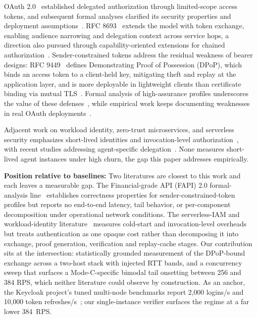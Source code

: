 \documentclass[conference]{IEEEtran}
\begin{document}
OAuth 2.0~\cite{rfc6749} established delegated authorization through limited-scope access tokens, and subsequent formal analyses clarified its security properties and deployment assumptions~\cite{oauth_formal,oidc_formal}. RFC 8693~\cite{rfc8693} extends the model with token exchange, enabling audience narrowing and delegation context across service hops, a direction also pursued through capability-oriented extensions for chained authorization~\cite{li2022capability}. Sender-constrained tokens address the residual weakness of bearer designs: RFC 9449~\cite{rfc9449} defines Demonstrating Proof of Possession (DPoP), which binds an access token to a client-held key, mitigating theft and replay at the application layer, and is more deployable in lightweight clients than certificate binding via mutual TLS~\cite{rfc8705}. Formal analysis of high-assurance profiles underscores the value of these defenses~\cite{fapi2_formal}, while empirical work keeps documenting weaknesses in real OAuth deployments~\cite{rahat2022cerberus}.

Adjacent work on workload identity, zero-trust microservices, and serverless security emphasizes short-lived identities and invocation-level authorization~\cite{eztrust2019,pontes2023spire,marin2022serverless,nist_zta}, with recent studies addressing agent-specific delegation~\cite{authenticated_delegation_agents,zouari2025leastprivilege}. None measures short-lived agent instances under high churn, the gap this paper addresses empirically.

\textbf{Position relative to baselines:} Two literatures are closest to this work and each leaves a measurable gap. The Financial-grade API (FAPI) 2.0 formal-analysis line~\cite{fapi2_formal,oauth_formal,oidc_formal} establishes correctness properties for sender-constrained-token profiles but reports no end-to-end latency, tail behavior, or per-component decomposition under operational network conditions. The serverless-IAM and workload-identity literature~\cite{sankaran2020,marin2022serverless,eztrust2019,pontes2023spire} measures cold-start and invocation-level overheads but treats authentication as one opaque cost rather than decomposing it into exchange, proof generation, verification and replay-cache stages. Our contribution sits at the intersection: statistically grounded measurement of the DPoP-bound exchange across a two-host stack with injected RTT bands, and a concurrency sweep that surfaces a Mode-C-specific bimodal tail onsetting between 256 and 384 RPS, which neither literature could observe by construction. As an anchor, the Keycloak project's tuned multi-node benchmarks report 2{,}000 logins/s and 10{,}000 token refreshes/s~\cite{keycloak2025bench}; our single-instance verifier surfaces the regime at a far lower 384~RPS.
\end{document}
